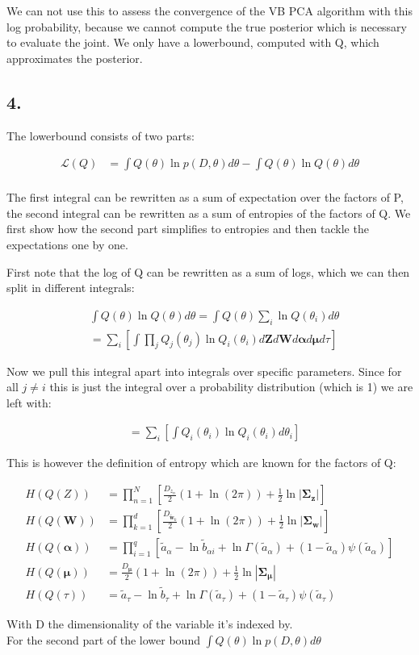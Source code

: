 \documentclass{article}
\def\*#1{\boldsymbol{#1}}
\begin{document}
We can not use this to assess the convergence of the VB PCA algorithm with this log probability, because we cannot compute the true posterior which is necessary to evaluate the joint. We only have a lowerbound, computed with Q, which approximates the posterior.

\subsection*{4.}

The lowerbound consists of two parts:

\begin{align*}
\mathcal{L}(Q) &= \int Q(\theta) \ln p(D, \theta) d\theta - \int Q(\theta) \ln Q(\theta) d\theta \\
\end{align*}

The first integral can be rewritten as a sum of expectation over the factors of P, the second integral can be rewritten as a sum of entropies of the factors of Q. We first show how the second part simplifies to entropies and then tackle the expectations one by one.

First note that the log of Q can be rewritten as a sum of logs, which we can then split in different integrals:

\begin{align*}
& \int Q(\theta) \ln Q(\theta) d\theta = \int Q(\theta) \sum_i \ln Q(\theta_i) d\theta\\
&= \sum_i \left[ \int \prod_j Q_j(\theta_j) \ln Q_i(\theta_i) d\*Z d\*W d\*\alpha d\*\mu d\tau \right]
\end{align*}

Now we pull this integral apart into integrals over specific parameters. Since for all $j \neq i$ this is just the integral over a probability distribution (which is 1) we are left with:

\begin{align*}
&= \sum_i \left[ \int Q_i(\theta_i) \ln Q_i(\theta_i) d\theta_i \right]
\end{align*}

This is however the definition of entropy which are known for the factors of Q:

\begin{align*}
H(Q(Z)) &= \prod_{n=1}^N \left [\frac{D_{z_n}}{2}  (1 + \ln (2\pi)) + \frac{1}{2} \ln |\*\Sigma_{\*z} | \right ] \\
H(Q(\*W)) &= \prod_{k=1}^d \left [ \frac{D_{\tilde{\*w}_k} }{2} (1 + \ln (2\pi)) + \frac{1}{2} \ln |\*\Sigma_{\*w} | \right ] \\
H(Q(\*\alpha)) &= \prod_{i = 1}^q \left [ \tilde{a}_\alpha - \ln \tilde{b}_{\alpha i} + \ln \Gamma(\tilde{a}_\alpha) + (1 - \tilde{a}_\alpha)\psi(\tilde{a}_\alpha) \right ]\\
H(Q(\*\mu)) &= \frac{D_{\*\mu}}{2}  (1 + \ln (2\pi)) + \frac{1}{2} \ln |\*\Sigma_{\*\mu} | \\
H(Q(\tau)) &= \tilde{a}_\tau - \ln \tilde{b}_{\tau} + \ln \Gamma(\tilde{a}_\tau) + (1 - \tilde{a}_\tau)\psi(\tilde{a}_\tau)
\end{align*}

With D the dimensionality of the variable it's indexed by.\\

For the second part of the lower bound $\int Q(\theta) \ln p(D, \theta) d\theta$
\end{document}
